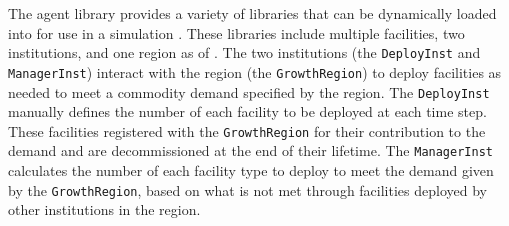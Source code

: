 The \Cycamore agent library provides a variety of libraries that can be 
dynamically loaded into \Cyclus for use in a simulation 
\cite{huff_fundamental_2016,carlsen_cycamore_2014}. These libraries 
include multiple facilities, two institutions, and one region as of 
 \cite{huff_fundamental_2016}. The two institutions 
(the \texttt{DeployInst} and \texttt{ManagerInst}) interact 
with the region (the \texttt{GrowthRegion}) to deploy 
facilities as needed to meet a commodity demand specified by the region. 
The \texttt{DeployInst} manually defines the number of each 
facility to be deployed at each time step. These facilities 
registered with the \texttt{GrowthRegion} for their 
contribution to the demand and are decommissioned at the end of their 
lifetime. The 
\texttt{ManagerInst} calculates the number of each facility 
type to deploy to meet the demand given by the \texttt{GrowthRegion}, 
based on what is not met through facilities deployed by other institutions 
in the region.  

